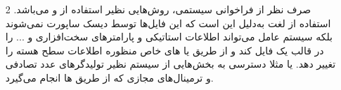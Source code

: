 \begin{itemize}
	\item [2] 
	صرف نظر از فراخوانی سیستمی، روش‌هایی نظیر استفاده از 
	و
	می‌باشد. استفاده از لغت
	به‌دلیل این است که این فایل‌ها توسط دیسک ساپورت نمی‌شوند بلکه سیستم عامل می‌تواند اطلاعات استاتیکی و پارامترهای سخت‌افزاری و ... را در قالب یک فایل
	کند و از طریق
	یا
	های خاص منظوره
	اطلاعات سطح هسته را تغییر دهد. یا مثلا دسترسی به بخش‌هایی از سیستم نظیر تولیدگرهای عدد تصادفی و ترمینال‌های مجازی که از طریق 
	ها
	انجام می‌گیرد.
\end{itemize}